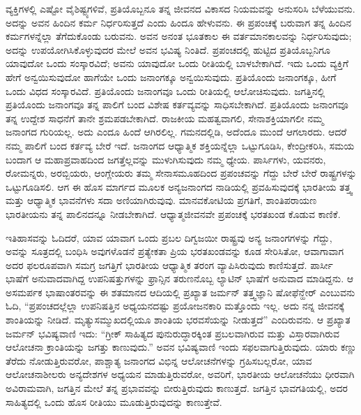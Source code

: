 ವ್ಯಕ್ತಿಗಳಲ್ಲಿ ಎಷ್ಟೋ ವೈಶಿಷ್ಟ್ಯಗಳಿವೆ, ಪ್ರತಿಯೊಬ್ಬನೂ ತನ್ನ ಜೀವನದ ವಿಕಾಸದ ನಿಯಮವನ್ನು ಅನುಸರಿಸಿ ಬೆಳೆಯುವನು. ಅದನ್ನು ಅವನ ಹಿಂದಿನ ಕರ್ಮ ನಿರ್ಧರಿಸುತ್ತದೆ ಎಂದು ಹಿಂದೂ ಹೇಳುವನು. ಈ ಪ್ರಪಂಚಕ್ಕೆ ಬರುವಾಗ ತನ್ನ ಹಿಂದಿನ ಕರ್ಮಗಳನ್ನೆಲ್ಲಾ ತೆಗೆದುಕೊಂಡು ಬರುವನು. ಅವನ ಅನಂತ ಭೂತಕಾಲ ಈ ವರ್ತಮಾನಕಾಲವನ್ನು ನಿರ್ಧರಿಸುವುದು; ಅದನ್ನು ಉಪಯೋಗಿಸಿಕೊಳ್ಳುವುದರ ಮೇಲೆ ಅವನ ಭವಿಷ್ಯ ನಿಂತಿದೆ. ಪ್ರಪಂಚದಲ್ಲಿ ಹುಟ್ಟಿದ ಪ್ರತಿಯೊಬ್ಬನಿಗೂ ಯಾವುದೋ ಒಂದು ಸಂಸ್ಕಾರವಿದೆ; ಅವನು ಯಾವುದೋ ಒಂದು ರೀತಿಯಲ್ಲಿ ಬಾಳಬೇಕಾಗಿದೆ. ಇದು ಒಂದು ವ್ಯಕ್ತಿಗೆ ಹೇಗೆ ಅನ್ವಯಿಸುವುದೋ ಹಾಗೆಯೇ ಒಂದು ಜನಾಂಗಕ್ಕೂ ಅನ್ವಯಿಸುವುದು. ಪ್ರತಿಯೊಂದು ಜನಾಂಗಕ್ಕೂ, ಹೀಗೆ ಒಂದು ವಿಧದ ಸಂಸ್ಕಾರವಿದೆ. ಪ್ರತಿಯೊಂದು ಜನಾಂಗವೂ ಒಂದು ರೀತಿಯಲ್ಲಿ ಆಲೋಚಿಸುವುದು. ಜಗತ್ತಿನಲ್ಲಿ ಪ್ರತಿಯೊಂದು ಜನಾಂಗವೂ ತನ್ನ ಪಾಲಿಗೆ ಬಂದ ವಿಶೇಷ ಕರ್ತವ್ಯವನ್ನು ಸಾಧಿಸಬೇಕಾಗಿದೆ. ಪ್ರತಿಯೊಂದು ಜನಾಂಗವೂ ತನ್ನ ಉದ್ದೇಶ ಸಾಧನೆಗೆ ತಾನೇ ಶ್ರಮಪಡಬೇಕಾಗಿದೆ. ರಾಜಕೀಯ ಮಹತ್ವವಾಗಲಿ, ಸೇನಾಶಕ್ತಿಯಾಗಲೀ ನಮ್ಮ ಜನಾಂಗದ ಗುರಿಯಲ್ಲ. ಅದು ಎಂದೂ ಹಿಂದೆ ಆಗಿರಲಿಲ್ಲ. ಗಮನದಲ್ಲಿಡಿ, ಅದೆಂದೂ ಮುಂದೆ ಆಗಲಾರದು. ಆದರೆ ನಮ್ಮ ಪಾಲಿಗೆ ಬಂದ ಕರ್ತವ್ಯ ಬೇರೆ ಇದೆ. ಜನಾಂಗದ ಆಧ್ಯಾತ್ಮಿಕ ಶಕ್ತಿಯನ್ನೆಲ್ಲಾ ಒಟ್ಟುಗೂಡಿಸಿ, ಕೇಂದ್ರೀಕರಿಸಿ, ಸಮಯ ಬಂದಾಗ ಆ ಮಹಾಪ್ರವಾಹದಿಂದ ಜಗತ್ತೆಲ್ಲವನ್ನು ಮುಳುಗಿಸುವುದು ನಮ್ಮ ಧ್ಯೇಯ. ಪಾರ್ಸಿಗಳು, ಯವನರು, ರೋಮನ್ನರು, ಅರಬ್ಬಿಯರು, ಆಂಗ್ಲೇಯರು ತಮ್ಮ ಸೇನಾಸಮೂಹದಿಂದ ಪ್ರಪಂಚವನ್ನು ಗೆದ್ದು ಬೇರೆ ಬೇರೆ ರಾಷ್ಟ್ರಗಳನ್ನು ಒಟ್ಟುಗೂಡಿಸಲಿ. ಆಗ ಈ ಹೊಸ ಮಾರ್ಗದ ಮೂಲಕ ಅನ್ಯಜನಾಂಗದ ನಾಡಿಯಲ್ಲಿ ಪ್ರವಹಿಸುವುದಕ್ಕೆ ಭಾರತೀಯ ತತ್ತ್ವ ಮತ್ತು ಆಧ್ಯಾತ್ಮಿಕ ಭಾವನೆಗಳು ಸದಾ ಅಣಿಯಾಗಿರುವುವು. ಮಾನವಕೋಟಿಯ ಪ್ರಗತಿಗೆ, ಶಾಂತಿಪರಾಯಣ ಭಾರತೀಯನು ತನ್ನ ಪಾಲಿನದನ್ನೂ ನೀಡಬೇಕಾಗಿದೆ. ಆಧ್ಯಾತ್ಮಜೀವನವೇ ಪ್ರಪಂಚಕ್ಕೆ ಭರತಖಂಡ ಕೊಡುವ ಕಾಣಿಕೆ.

ಇತಿಹಾಸವನ್ನು ಓದಿದರೆ, ಯಾವ ಯಾವಾಗ ಒಂದು ಪ್ರಬಲ ದಿಗ್ವಜಯೀ ರಾಷ್ಟ್ರವು ಅನ್ಯ ಜನಾಂಗಗಳನ್ನು ಗೆದ್ದು, ಅವನ್ನು ಸೂತ್ರದಲ್ಲಿ ಬಂಧಿಸಿ ಅವುಗಳೊಡನೆ ಪ್ರತ್ಯೇಕತಾ ಪ್ರಿಯ ಭರತಖಂಡವನ್ನು ಕೂಡ ಸೇರಿಸಿತೋ, ಆವಾಗಾವಾಗ ಅದರ ಫಲರೂಪವಾಗಿ ಸಮಗ್ರ ಜಗತ್ತಿಗೆ ಭಾರತೀಯ ಆಧ್ಯಾತ್ಮಿಕ ತರಂಗ ವ್ಯಾಪಿಸಿರುವುದು ಕಾಣಿಸುತ್ತದೆ. ಪಾರ್ಸೀ ಭಾಷೆಗೆ ಅನುವಾದವಾಗಿದ್ದ ಉಪನಿಷತ್ತುಗಳನ್ನು ಫ್ರಾನ್ಸಿನ ತರುಣನೊಬ್ಬ ಲ್ಯಾಟಿನ್​ ಭಾಷೆಗೆ ಅನುವಾದ ಮಾಡಿದ್ದನು. ಆ ಅಸಮರ್ಪಕ ಭಾಷಾಂತರವನ್ನು ಈ ಶತಮಾನದ ಆದಿಯಲ್ಲಿ ಪ್ರಖ್ಯಾತ ಜರ್ಮನ್​ ತತ್ತ್ವಜ್ಞಾನಿ ಷೋಫೆನ್ಹೇರ್​ ಎಂಬುವನು ಓದಿ, “ಪ್ರಪಂಚದಲ್ಲೆಲ್ಲಾ ಉಪನಿಷತ್ತಿನ ಅಧ್ಯಯನದಷ್ಟು ಪ್ರಯೋಜನಕಾರಿ ಮತ್ತೊಂದು ಇಲ್ಲ. ಅದು ನನ್ನ ಜೀವನಕ್ಕೆ ಶಾಂತಿಯನ್ನು ನೀಡಿದೆ. ಮೃತ್ಯುಸಮ್ಮುಖದಲ್ಲಿಯೂ ಶಾಂತಿಯ ಭರವಸೆಯನ್ನು ನೀಡುತ್ತದೆ” ಎಂದಿರುವನು. ಆ ಪ್ರಖ್ಯಾತ ಜರ್ಮನ್​ ಭವಿಷ್ಯವಾಣಿ ಇದು: “ಗ್ರೀಕ್​ ಸಾಹಿತ್ಯದ ಪುನುರುದ್ಧಾರಕ್ಕಿಂತ ಪ್ರಬಲವಾಗಿರುವ ಮತ್ತು ವಿಸ್ತಾರವಾಗಿರುವ ಆಲೋಚನಾ ಕ್ರಾಂತಿಯನ್ನು ಜಗತ್ತು ಕಾಣುವುದು.” ಅವನ ಭವಿಷ್ಯವಾಣಿ ಇಂದು ಸಫಲವಾಗುತ್ತಿರುವುದು. ಯಾರು ಕಣ್ಣು ತೆರೆದು ನೋಡುತ್ತಿರುವರೋ, ಪಾಶ್ಚಾತ್ಯ ಜನಾಂಗದ ವಿಭಿನ್ನ ಆಲೋಚನೆಗಳನ್ನು ಗ್ರಹಿಸಬಲ್ಲರೋ, ಯಾವ ಆಲೋಚನಾಶೀಲರು ಅನ್ಯದೇಶಗಳ ಅಧ್ಯಯನ ಮಾಡುತ್ತಿರುವರೋ, ಅವರಿಗೆ, ಭಾರತೀಯ ಆಲೋಚನೆಯು ಧೀರವಾಗಿ ಅವಿರಾಮವಾಗಿ, ಜಗತ್ತಿನ ಮೇಲೆ ತನ್ನ ಪ್ರಭಾವವನ್ನು ಬೀರುತ್ತಿರುವುದು ಕಾಣುತ್ತದೆ. ಜಗತ್ತಿನ ಭಾವಗತಿಯಲ್ಲಿ, ಅದರ ಸಾಹಿತ್ಯದಲ್ಲಿ ಒಂದು ಹೊಸ ರೀತಿಯು ಮೂಡುತ್ತಿರುವುದನ್ನು ಕಾಣುತ್ತೇವೆ.

